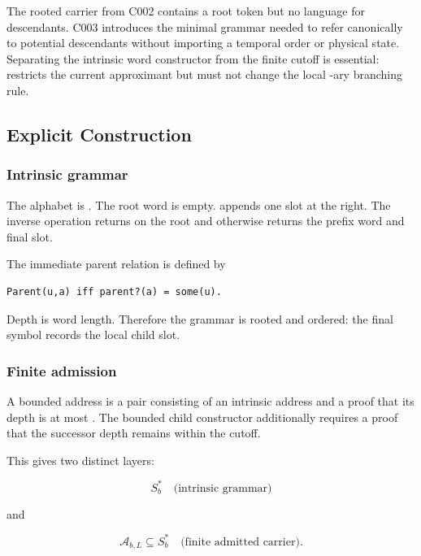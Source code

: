 The rooted carrier from C002 contains a root token but no language for
descendants. C003 introduces the minimal grammar needed to refer
canonically to potential descendants without importing a temporal order
or physical state. Separating the intrinsic word constructor from the
finite cutoff is essential: \texttt{\protect{}} restricts the current approximant
but must not change the local \texttt{\protect{}}-ary branching rule.

\subsection{Explicit Construction}\label{explicit-construction-1}

\subsubsection{Intrinsic grammar}\label{intrinsic-grammar}

The alphabet is \texttt{\protect{}}. The root word is empty. \texttt{\protect{}}
appends one slot at the right. The inverse operation \texttt{\protect{}}
returns \texttt{\protect{}} on the root and otherwise returns the prefix word
and final slot.

The immediate parent relation is defined by

\begin{verbatim}
Parent(u,a) iff parent?(a) = some(u).
\end{verbatim}

Depth is word length. Therefore the grammar is rooted and ordered: the
final symbol records the local child slot.

\subsubsection{Finite admission}\label{finite-admission}

A bounded address is a pair consisting of an intrinsic address and a
proof that its depth is at most \texttt{\protect{}}. The bounded child
constructor additionally requires a proof that the successor depth
remains within the cutoff.

This gives two distinct layers:

\[
S_b^* \quad\text{(intrinsic grammar)}
\]

and

\[
\mathcal A_{b,L}\subseteq S_b^* \quad\text{(finite admitted carrier)}.
\]

